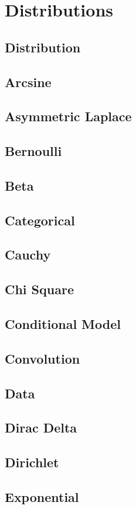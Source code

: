 \documentclass{article}
\begin{document}
\section{Distributions}
\subsection{Distribution}
\subsection{Arcsine}
\subsection{Asymmetric Laplace}
\subsection{Bernoulli}
\subsection{Beta}
\subsection{Categorical}
\subsection{Cauchy}
\subsection{Chi Square}
\subsection{Conditional Model}
\subsection{Convolution}
\subsection{Data}
\subsection{Dirac Delta}
\subsection{Dirichlet}
\subsection{Exponential}
\end{document}
